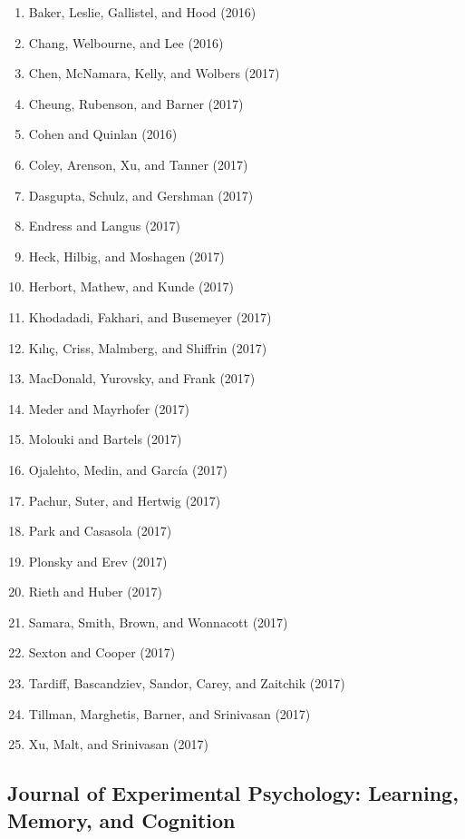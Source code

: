 \documentclass[english,man]{apa6}
\providecommand{\tightlist}{%
  \setlength{\itemsep}{0pt}\setlength{\parskip}{0pt}}
\theoremstyle{definition}
\theoremstyle{definition}
\theoremstyle{definition}
\theoremstyle{remark}
\begin{document}
\begin{enumerate}
\def\labelenumi{\arabic{enumi})}
\tightlist
\item
  Baker, Leslie, Gallistel, and Hood (2016)
\item
  Chang, Welbourne, and Lee (2016)
\item
  Chen, McNamara, Kelly, and Wolbers (2017)
\item
  Cheung, Rubenson, and Barner (2017)
\item
  Cohen and Quinlan (2016)
\item
  Coley, Arenson, Xu, and Tanner (2017)
\item
  Dasgupta, Schulz, and Gershman (2017)
\item
  Endress and Langus (2017)
\item
  Heck, Hilbig, and Moshagen (2017)
\item
  Herbort, Mathew, and Kunde (2017)
\item
  Khodadadi, Fakhari, and Busemeyer (2017)
\item
  Kılıç, Criss, Malmberg, and Shiffrin (2017)
\item
  MacDonald, Yurovsky, and Frank (2017)
\item
  Meder and Mayrhofer (2017)
\item
  Molouki and Bartels (2017)
\item
  Ojalehto, Medin, and García (2017)
\item
  Pachur, Suter, and Hertwig (2017)
\item
  Park and Casasola (2017)
\item
  Plonsky and Erev (2017)
\item
  Rieth and Huber (2017)
\item
  Samara, Smith, Brown, and Wonnacott (2017)
\item
  Sexton and Cooper (2017)
\item
  Tardiff, Bascandziev, Sandor, Carey, and Zaitchik (2017)
\item
  Tillman, Marghetis, Barner, and Srinivasan (2017)
\item
  Xu, Malt, and Srinivasan (2017)
\end{enumerate}

\subsection{Journal of Experimental Psychology: Learning, Memory, and
Cognition}\label{journal-of-experimental-psychology-learning-memory-and-cognition}
\end{document}
